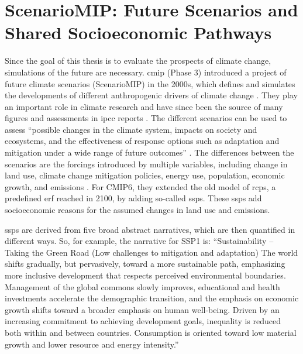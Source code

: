 \section{ScenarioMIP: Future Scenarios and Shared Socioeconomic Pathways}

\label{sec:scenariomip}

Since the goal of this thesis is to evaluate the prospects of climate change, simulations of the future are necessary. 
\ac{cmip} (Phase 3) introduced a project of future climate scenarios (ScenarioMIP) in the 2000s, which defines and simulates the developments of different anthropogenic drivers of climate change \cite{oneill_scenario_2016}. 
They play an important role in climate research and have since been the source of many figures and assessments in \ac{ipcc} reports \cite{touzepeiffer_coupled_2020}. 
The different scenarios can be used to assess \enquote{possible changes in the climate system, impacts on society and ecosystems, and the effectiveness of response options such as adaptation and mitigation under a wide range of future outcomes} \cite{oneill_scenario_2016}.
The differences between the scenarios are the forcings introduced by multiple variables, including change in land use, climate change mitigation policies, energy use, population, economic growth, and emissions \cite{riahi_shared_2017}.   
For CMIP6, they extended the old model of \acp{rcp}, a predefined \ac{erf} reached in 2100, by adding so-called \acp{ssp}. 
These \acp{ssp} add socioeconomic reasons for the assumed changes in land use and emissions. 


\acp{ssp} are derived from five broad abstract narratives, which are then quantified in different ways. 
So, for example, the narrative for SSP1 is: \enquote{Sustainability – Taking the Green Road (Low challenges to mitigation and adaptation) The world shifts gradually, but pervasively, toward a more sustainable path, emphasizing more inclusive development that respects perceived environmental boundaries. Management of the global commons slowly improves, educational and health investments accelerate the demographic transition, and the emphasis on economic growth shifts toward a broader emphasis on human well-being. Driven by an increasing commitment to achieving development goals, inequality is reduced both within and between countries. Consumption is oriented toward low material growth and lower resource and energy intensity.} \cite{riahi_shared_2017}

